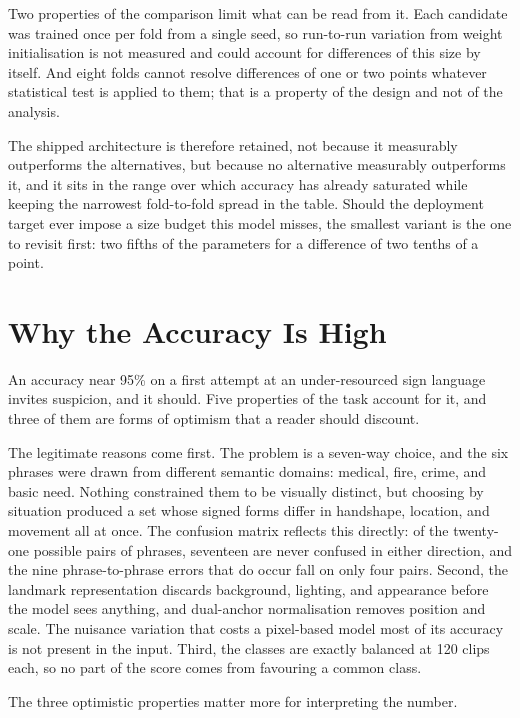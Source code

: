 Two properties of the comparison limit what can be read from it. Each candidate was trained
once per fold from a single seed, so run-to-run variation from weight initialisation is not
measured and could account for differences of this size by itself. And eight folds cannot
resolve differences of one or two points whatever statistical test is applied to them; that
is a property of the design and not of the analysis.

The shipped architecture is therefore retained, not because it measurably outperforms the
alternatives, but because no alternative measurably outperforms it, and it sits in the range
over which accuracy has already saturated while keeping the narrowest fold-to-fold spread in
the table. Should the deployment target ever impose a size budget this model misses, the
smallest variant is the one to revisit first: two fifths of the parameters for a difference
of two tenths of a point.

\section{Why the Accuracy Is High}
\label{sec:whyhigh}

An accuracy near 95\% on a first attempt at an under-resourced sign language invites
suspicion, and it should. Five properties of the task account for it, and three of them are
forms of optimism that a reader should discount.

The legitimate reasons come first. The problem is a seven-way choice, and the six phrases
were drawn from different semantic domains: medical, fire, crime, and basic need. Nothing
constrained them to be visually distinct, but choosing by situation produced a set whose
signed forms differ in handshape, location, and movement all at once. The confusion matrix
reflects this directly: of the twenty-one possible pairs of phrases, seventeen are never
confused in either direction, and the nine phrase-to-phrase errors that do occur fall on
only four pairs. Second, the landmark representation discards background, lighting, and appearance
before the model sees anything, and dual-anchor normalisation removes position and scale.
The nuisance variation that costs a pixel-based model most of its accuracy is not present
in the input. Third, the classes are exactly balanced at 120 clips each, so no part of the
score comes from favouring a common class.

The three optimistic properties matter more for interpreting the number.

